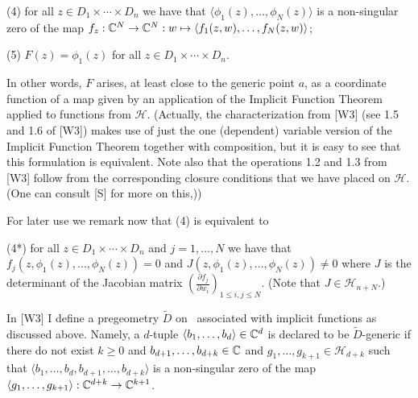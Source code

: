 \documentclass[12pt,nodate]{article}
\begin{document}
\vspace{3mm}

\noindent
(4) \hspace{2mm} for all $z \in D_1 \times \cdots \times D_n$ we have that
 $\langle \phi_1 (z), \ldots , \phi_N (z) \rangle$ is a non-singular zero of the map $f_z : \mathbb{C}^N \rightarrow \mathbb{C}^N : w \mapsto \langle f_1 (z, w), \ldots , f_N (z, w) \rangle$;
 
 \vspace{3mm}
 
 \noindent
 (5) \hspace{2mm} $F(z) = \phi_1 (z)$ for all $z \in   D_1 \times \cdots \times D_n$.
 
\vspace{3mm}
 
 In other words, $F$ arises, at least close to the generic point $a$, as a coordinate function of a map given by an application of the Implicit Function Theorem applied to functions from $\mathcal{H}$. (Actually, the characterization from [W3] (see 1.5 and 1.6 of [W3]) makes use of just the one (dependent) variable version of the Implicit Function Theorem together with composition, but it is easy to see that this formulation is equivalent. Note also that the operations 1.2 and 1.3 from [W3] follow from the corresponding closure conditions that we have placed on $\mathcal{H}$. (One can consult [S] for more on this,))
 
\vspace{3mm}
 
 For later use we remark now that (4) is equivalent to
 
 \vspace{3mm}

 \noindent  
 (4*) \hspace{2mm} for all $z \in D_1 \times \cdots \times D_n$ and $j = 1, \ldots , N$ we have that \\ $f_j (z , \phi_1 (z) , \ldots , \phi_N (z) ) = 0$ and $J(z, \phi_1 (z) , \ldots , \phi_N (z)) \neq 0$ where $J$ is the determinant of the Jacobian matrix $( \frac{\partial f_j}{\partial w_i} )_{1 \leq i, j \leq N}$. (Note that $J \in \mathcal{H}_{n+N}$.)
 
 \vspace{4mm}
 
 In [W3] I define a pregeometry $\widetilde{D}$ on \C\  associated with implicit functions as discussed above. Namely, a $d$-tuple $\langle b_1 , \ldots , b_d \rangle \in \mathbb{C}^d$   is declared to be $\widetilde{D}$-generic if there do not exist $k \geq 0$ and $b_{d+1} , \ldots , b_{d+k} \in \mathbb{C}$ and 
 $g_{1} , \ldots , g_{k+1} \in \mathcal{H}_{d+k}$ such that $\langle b_1 , \ldots , b_d , b_{d+1} , \ldots , b_{d+k} \rangle$ is a non-singular zero of the map $\langle g_{1} , \ldots , g_{k+1} \rangle : \mathbb{C}^{d+k} \rightarrow \mathbb{C}^{k+1}$.
 
\end{document}
